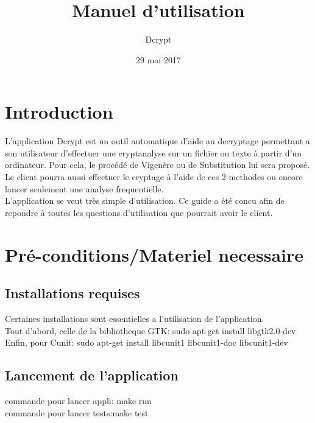 \documentclass[a4]{article}
\begin{document}
	\title{\Huge{\textbf{Manuel d'utilisation}}}
	\author{Dcrypt}
	\date{29 mai 2017}
		

	\begin{titlepage}
		\maketitle
		\vspace{20em}
	\end{titlepage}
	\section{Introduction}
L'application Dcrypt est un outil automatique d'aide au decryptage permettant a son utilisateur d'effectuer une cryptanalyse
sur un fichier ou texte à partir d'un ordinateur. Pour cela, le procédé de Vigenère ou de Substitution lui sera proposé. \\
Le client pourra aussi effectuer le cryptage à l'aide de ces 2 methodes ou encore lancer seulement une analyse frequentielle. \\
L’application se veut très simple d’utilisation. Ce guide a été concu afin de repondre à toutes les questions d'utilisation que
pourrait avoir le client.


	\section{Pré-conditions/Materiel necessaire}

		\subsection{Installations requises}
			Certaines installations sont essentielles a l'utilisation de l'application.\\
			Tout d'abord, celle de la bibliotheque GTK: sudo apt-get install libgtk2.0-dev \\
			Enfin, pour Cunit:  sudo apt-get install libcunit1 libcunit1-doc libcunit1-dev \\

		\subsection{Lancement de l'application}
			commande pour lancer appli: make run \\
			commande pour lancer tests:make test\\
\end{document}
